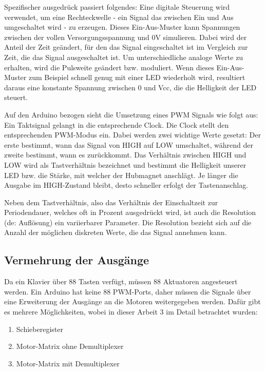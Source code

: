 Spezifischer ausgedrück passiert folgendes:
Eine digitale Steuerung wird verwendet, um eine Rechteckwelle - ein Signal das zwischen Ein und Aus umgeschaltet wird - zu erzeugen.
Dieses Ein-Aus-Muster kann Spannungen zwischen der vollen Versorgungsspannung und 0V simulieren.
Dabei wird der Anteil der Zeit geändert, für den das Signal eingeschaltet ist im Vergleich zur Zeit, die das Signal ausgeschaltet ist.
Um unterschiedliche analoge Werte zu erhalten, wird die Pulsweite geändert bzw. moduliert.
Wenn dieses Ein-Aus-Muster zum Beispiel schnell genug mit einer LED wiederholt wird, resultiert daraus eine konstante Spannung zwischen 0 und Vcc, die die Helligkeit der LED steuert.

Auf den Arduino bezogen sieht die Umsetzung eines \ac{PWM} Signals wie folgt aus:
Ein Taktsignal gelangt in die entsprechende Clock.
Die Clock stellt den entsprechenden \ac{PWM}-Modus ein.
Dabei werden zwei wichtige Werte gesetzt:
Der erste bestimmt, wann das Signal von HIGH auf LOW umschaltet, während der zweite bestimmt, wann es zurückkommt.
Das Verhältnis zwischen HIGH und LOW wird als Tastverhältnis bezeichnet und bestimmt die Helligkeit unserer LED bzw. die Stärke, mit welcher der Hubmagnet anschlägt.
Je länger die Ausgabe im HIGH-Zustand bleibt, desto schneller erfolgt der Tastenanschlag.

Neben dem Tastverhältnis, also das Verhältnis der Einschaltzeit zur Periodendauer, welches oft in Prozent ausgedrückt wird, ist auch die Resolution (de: Auflösung) ein variierbarer Parameter.
Die Resolution bezieht sich auf die Anzahl der möglichen diskreten Werte, die das Signal annehmen kann.


\subsection{Vermehrung der Ausgänge}\label{output}
Da ein Klavier über 88 Tasten verfügt, müssen 88 Aktuatoren angesteuert werden. Ein Arduino hat keine 88 \ac{PWM}-Ports, daher
müssen die Signale über eine Erweiterung der Ausgänge an die Motoren weitergegeben werden. Dafür gibt es mehrere Möglichkeiten,
wobei in dieser Arbeit 3 im Detail betrachtet wurden:

\begin{enumerate}
	\item Schieberegister
	\item Motor-Matrix ohne Demultiplexer
	\item Motor-Matrix mit Demultiplexer
\end{enumerate}

